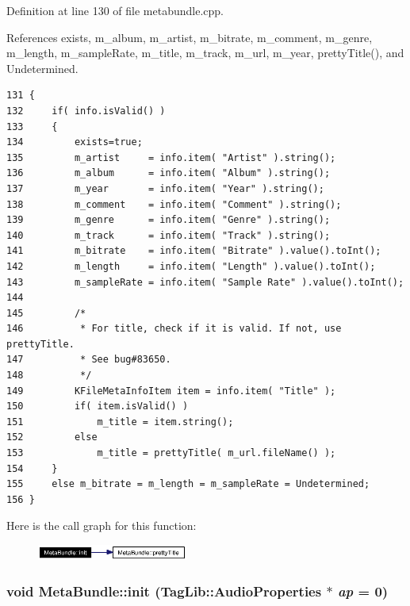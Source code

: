 Definition at line 130 of file metabundle.cpp.

References exists, m\_\-album, m\_\-artist, m\_\-bitrate, m\_\-comment, m\_\-genre, m\_\-length, m\_\-sample\-Rate, m\_\-title, m\_\-track, m\_\-url, m\_\-year, pretty\-Title(), and Undetermined.



\footnotesize\begin{verbatim}131 {
132     if( info.isValid() )
133     {
134         exists=true;
135         m_artist     = info.item( "Artist" ).string();
136         m_album      = info.item( "Album" ).string();
137         m_year       = info.item( "Year" ).string();
138         m_comment    = info.item( "Comment" ).string();
139         m_genre      = info.item( "Genre" ).string();
140         m_track      = info.item( "Track" ).string();
141         m_bitrate    = info.item( "Bitrate" ).value().toInt();
142         m_length     = info.item( "Length" ).value().toInt();
143         m_sampleRate = info.item( "Sample Rate" ).value().toInt();
144 
145         /*
146          * For title, check if it is valid. If not, use prettyTitle.
147          * See bug#83650.
148          */
149         KFileMetaInfoItem item = info.item( "Title" );
150         if( item.isValid() )
151             m_title = item.string();
152         else
153             m_title = prettyTitle( m_url.fileName() );
154     }
155     else m_bitrate = m_length = m_sampleRate = Undetermined;
156 }
\end{verbatim}\normalsize 


Here is the call graph for this function:\begin{figure}[H]
\begin{center}
\leavevmode
\includegraphics[width=140pt]{classMetaBundle_MetaBundled1_cgraph}
\end{center}
\end{figure}
\subsubsection{\setlength{\rightskip}{0pt plus 5cm}void Meta\-Bundle::init (Tag\-Lib::Audio\-Properties $\ast$ {\em ap} = 0)\hspace{0.3cm}{\tt  [private]}}\label{classMetaBundle_MetaBundled0}




